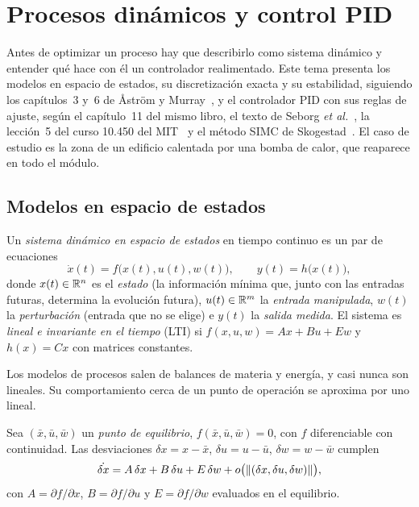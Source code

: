 \chapter{Procesos dinámicos y control PID}
\label{tema:1}

Antes de optimizar un proceso hay que describirlo como sistema dinámico y entender qué hace con él un controlador realimentado. Este tema presenta los modelos en espacio de estados, su discretización exacta y su estabilidad, siguiendo los capítulos~3 y~6 de Åström y Murray~\cite{am}, y el controlador PID con sus reglas de ajuste, según el capítulo~11 del mismo libro, el texto de Seborg \emph{et al.}~\cite{seborg}, la lección~5 del curso 10.450 del MIT~\cite{mit10450} y el método SIMC de Skogestad~\cite{skogestad}. El caso de estudio es la zona de un edificio calentada por una bomba de calor, que reaparece en todo el módulo.

\section{Modelos en espacio de estados}

\begin{definicion}\label{def:ee}
Un \emph{sistema dinámico en espacio de estados} en tiempo continuo es un par de ecuaciones
\[
\dot x(t)=f\bigl(x(t),u(t),w(t)\bigr),\qquad y(t)=h\bigl(x(t)\bigr),
\]
donde $x(t)\in\mathbb{R}^{n}$ es el \emph{estado} (la información mínima que, junto con las entradas futuras, determina la evolución futura), $u(t)\in\mathbb{R}^{m}$ la \emph{entrada manipulada}, $w(t)$ la \emph{perturbación} (entrada que no se elige) e $y(t)$ la \emph{salida medida}. El sistema es \emph{lineal e invariante en el tiempo} (LTI) si $f(x,u,w)=Ax+Bu+Ew$ y $h(x)=Cx$ con matrices constantes.
\end{definicion}

Los modelos de procesos salen de balances de materia y energía, y casi nunca son lineales. Su comportamiento cerca de un punto de operación se aproxima por uno lineal.

\begin{proposicion}[Linealización]\label{prop:lineal}
Sea $(\bar x,\bar u,\bar w)$ un \emph{punto de equilibrio}, $f(\bar x,\bar u,\bar w)=0$, con $f$ diferenciable con continuidad. Las desviaciones $\delta x=x-\bar x$, $\delta u=u-\bar u$, $\delta w=w-\bar w$ cumplen
\[
\dot{\delta x}=A\,\delta x+B\,\delta u+E\,\delta w+o\bigl(\lVert(\delta x,\delta u,\delta w)\rVert\bigr),
\]
con $A=\partial f/\partial x$, $B=\partial f/\partial u$ y $E=\partial f/\partial w$ evaluados en el equilibrio.
\end{proposicion}

